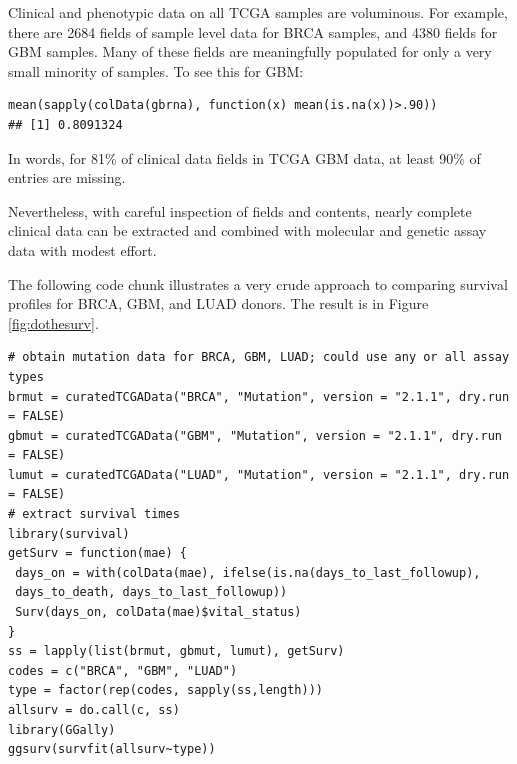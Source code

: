 \documentclass[graybox]{svmult}
\begin{document}
Clinical and phenotypic data on all TCGA samples are voluminous. For example,
there are 2684 fields of sample level data for BRCA
samples, and 4380 fields for GBM samples. Many of these
fields are meaningfully populated for only a very small minority of samples.
To see this for GBM:


\begin{shaded}
\begin{verbatim}
mean(sapply(colData(gbrna), function(x) mean(is.na(x))>.90))
## [1] 0.8091324
\end{verbatim}
\end{shaded}

In words, for 81\% of clinical data fields in TCGA GBM data,
at least 90\% of entries are missing.

Nevertheless, with careful inspection of fields and contents,
nearly complete clinical data can be extracted and combined with molecular
and genetic assay data with modest effort.

The following code chunk illustrates a very crude
approach to comparing survival profiles for BRCA, GBM, and LUAD
donors. The result is in Figure \ref{fig:dothesurv}.


{\small
\begin{shaded}
\begin{verbatim}
# obtain mutation data for BRCA, GBM, LUAD; could use any or all assay types
brmut = curatedTCGAData("BRCA", "Mutation", version = "2.1.1", dry.run = FALSE)
gbmut = curatedTCGAData("GBM", "Mutation", version = "2.1.1", dry.run = FALSE)
lumut = curatedTCGAData("LUAD", "Mutation", version = "2.1.1", dry.run = FALSE)
# extract survival times
library(survival)
getSurv = function(mae) {
 days_on = with(colData(mae), ifelse(is.na(days_to_last_followup),
 days_to_death, days_to_last_followup))
 Surv(days_on, colData(mae)$vital_status)
}
ss = lapply(list(brmut, gbmut, lumut), getSurv)
codes = c("BRCA", "GBM", "LUAD")
type = factor(rep(codes, sapply(ss,length)))
allsurv = do.call(c, ss)
library(GGally)
ggsurv(survfit(allsurv~type))
\end{verbatim}
\end{shaded}
}
\end{document}
